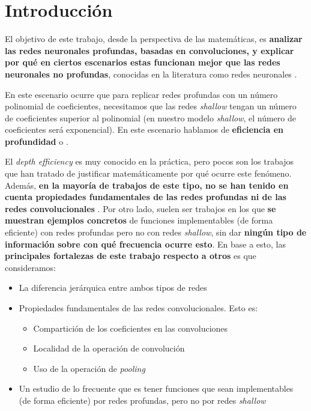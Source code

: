 
\chapter{Introducción}\label{ch:introduccion}

El objetivo de este trabajo, desde la perspectiva de las matemáticas, es \textbf{analizar las redes neuronales profundas, basadas en convoluciones, y explicar por qué en ciertos escenarios estas funcionan mejor que las redes neuronales no profundas}, conocidas en la literatura como redes neuronales .

En este escenario ocurre que para replicar redes profundas con un número polinomial de coeficientes, necesitamos que las redes \textit{shallow} tengan un número de coeficientes superior al polinomial (en nuestro modelo \textit{shallow}, el número de coeficientes será exponencial). En este escenario hablamos de \textbf{eficiencia en profundidad} o \textbf{}.

El \textit{depth efficiency} es muy conocido en la práctica, pero pocos son los trabajos que han tratado de justificar matemáticamente por qué ocurre este fenómeno. Además, \textbf{en la mayoría de trabajos de este tipo, no se han tenido en cuenta propiedades fundamentales de las redes profundas ni de las redes convolucionales} \cite{matematicas:paper_depth_malo_01} \cite{matematicas:paper_depth_malo_02} \cite{matematicas:paper_depth_malo_03}. Por otro lado, suelen ser trabajos en los que \textbf{se muestran ejemplos concretos} de funciones implementables (de forma eficiente) con redes profundas pero no con redes \textit{shallow}, sin dar \textbf{ningún tipo de información sobre con qué frecuencia ocurre esto}. En base a esto, las \textbf{principales fortalezas de este trabajo respecto a otros} es que consideramos:

\begin{itemize}
    \item La diferencia jerárquica entre ambos tipos de redes
    \item Propiedades fundamentales de las redes convolucionales. Esto es:
        \begin{itemize}
            \item Compartición de los coeficientes en las convoluciones
            \item Localidad de la operación de convolución
            \item Uso de la operación de \textit{pooling}
        \end{itemize}
    \item Un estudio de lo frecuente que es tener funciones que sean implementables (de forma eficiente) por redes profundas, pero no por redes \textit{shallow}
\end{itemize}

